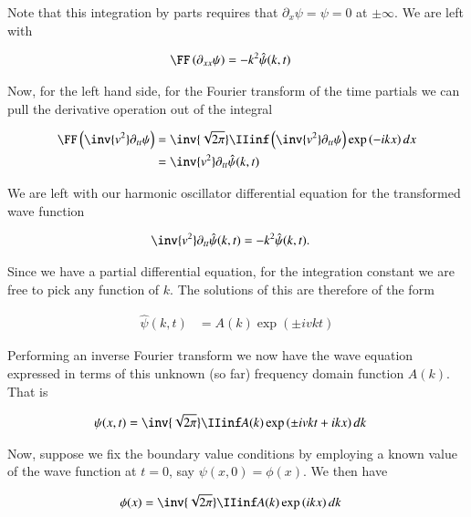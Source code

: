 Note that this integration by parts requires that $\partial_x \psi = \psi = 0$ at $\pm \infty$.  We are left with 

\begin{align*}
\FF\left( \partial_{xx} \psi \right) &= -k^2 \hat{\psi}(k, t)
\end{align*}

Now, for the left hand side, for the Fourier transform of the time partials we can pull the derivative operation out of the 
integral

\begin{align*}
\FF\left( \inv{v^2} \partial_{tt} \psi \right) 
&= \inv{\sqrt{2 \pi}} \IIinf \left( \inv{v^2} \partial_{tt} \psi \right) \exp\left( -i k x \right) dx \\
&= \inv{v^2} \partial_{tt} \hat{\psi}(k,t) \\
\end{align*}

We are left with our harmonic oscillator differential equation for the transformed wave function

\begin{align*}
\inv{v^2} \partial_{tt} \hat{\psi}(k,t) &= -k^2 \hat{\psi}(k, t).
\end{align*}

Since we have a partial differential equation, for the integration constant we are free to pick any function of $k$.  The solutions of this are therefore of the form

\begin{align*}
\hat{\psi}(k,t) &= A(k) \exp\left( \pm i v k t \right)
\end{align*}

Performing an inverse Fourier transform we now have the wave equation expressed in terms of this unknown (so far) frequency domain function $A(k)$.  That is

\begin{align}\label{eqn:wave_fourier:almostThere}
{\psi}(x,t) &= \inv{\sqrt{2\pi}} \IIinf A(k) \exp\left( \pm i v k t + i k x \right) dk
\end{align}

Now, suppose we fix the boundary value conditions by employing a known value of the wave function at $t = 0$, say $\psi(x,0) = \phi(x)$.  We then have

\begin{align*}
{\phi}(x) &= \inv{\sqrt{2\pi}} \IIinf A(k) \exp\left( i k x \right) dk
\end{align*}

